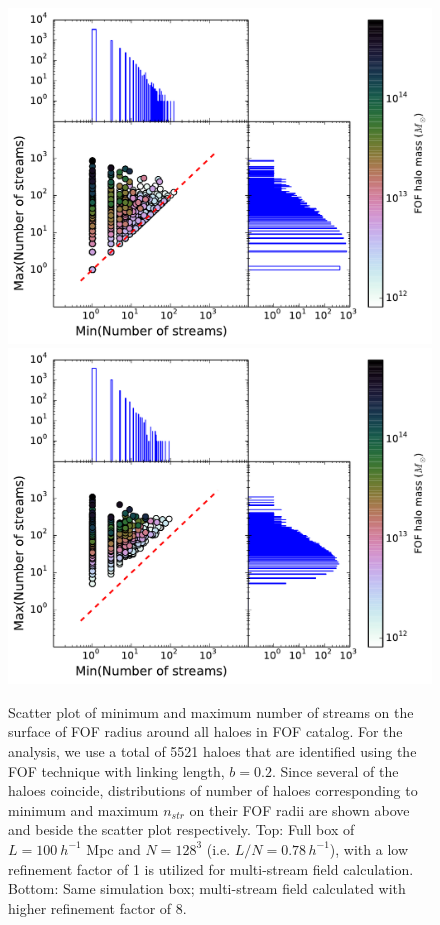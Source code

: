  
 \begin{figure}
\begin{minipage}[t]{.99\linewidth}
  \centering\includegraphics[width=10.cm]{Chapter3/Source_v2/fig11a}
\includegraphics[width=10.cm]{Chapter3/Source_v2/fig11b} 

\end{minipage}\hfill
\caption{Scatter plot of minimum and maximum number of streams on the surface of FOF radius around all haloes in FOF catalog. For the analysis, we use a total of 5521 haloes that are identified using the FOF technique with linking length, $b=0.2$. Since several of the haloes coincide, distributions of number of haloes corresponding to minimum and maximum $n_{str}$ on their FOF radii are shown above and beside the scatter plot respectively. Top: Full box of $L =100 ~h^{-1}$ Mpc and $N = 128^3$ (i.e. $L/N = 0.78 \,h^{-1}$), with a low refinement factor of 1 is utilized for multi-stream field calculation. Bottom: Same simulation box; multi-stream field calculated with higher refinement factor of 8.}
\label{fig:minmax128}
\end{figure}

